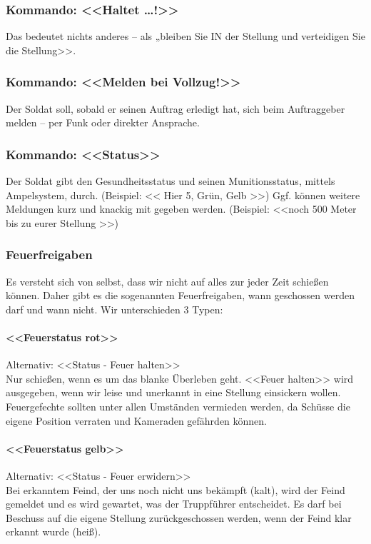 \subsubsection{Kommando: <<Haltet …!>>}
	Das bedeutet nichts anderes – als „bleiben Sie IN der Stellung und verteidigen Sie die Stellung>>.

\subsubsection{Kommando: <<Melden bei Vollzug!>>}
	Der Soldat soll, sobald er seinen Auftrag erledigt hat, sich beim Auftraggeber melden – per Funk oder direkter Ansprache.

\subsubsection{Kommando: <<Status>>}
	Der Soldat gibt den Gesundheitsstatus und seinen Munitionsstatus, mittels Ampelsystem, durch. (Beispiel: << Hier 5, Grün, Gelb >>) Ggf. können weitere Meldungen kurz und knackig mit gegeben werden. (Beispiel: <<noch 500 Meter bis zu eurer Stellung >>)

\subsubsection{Feuerfreigaben}
	Es versteht sich von selbst, dass wir nicht auf alles zur jeder Zeit schießen können. Daher gibt es die sogenannten Feuerfreigaben, wann geschossen werden darf und wann nicht. Wir unterschieden 3 Typen:

\paragraph*{<<Feuerstatus rot>>}
	Alternativ: <<Status - Feuer halten>>\hfil\\
	Nur schießen, wenn es um das blanke Überleben geht. <<Feuer halten>> wird ausgegeben, wenn wir leise und unerkannt in eine Stellung einsickern wollen. Feuergefechte sollten unter allen Umständen vermieden werden, da Schüsse die eigene Position verraten und Kameraden gefährden können.

\paragraph*{<<Feuerstatus gelb>>}
	Alternativ: <<Status - Feuer erwidern>>\hfil\\
	Bei erkanntem Feind, der uns noch nicht uns bekämpft (kalt), wird der Feind gemeldet und es wird gewartet, was der Truppführer entscheidet. Es darf bei Beschuss auf die eigene Stellung zurückgeschossen werden, wenn der Feind klar erkannt wurde (heiß). \\

